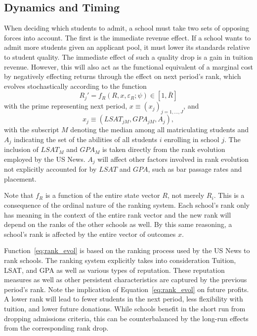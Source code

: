 \documentclass[12pt]{article}
\theoremstyle{definition}
\begin{document}
\subsection{Dynamics and Timing}
\label{sec:dynamics_timing}
When deciding which students to admit, a school must take two sets of opposing forces into account. The first is the immediate revenue effect. If a school wants to admit more students given an applicant pool, it must lower its standards relative to student quality. The immediate effect of such a quality drop is a gain in tuition revenue. However, this will also act as the functional equivalent of a marginal cost by negatively effecting returns through the effect on next period's rank, which evolves stochastically according to the function
\begin{equation}
  R_j' = f_R(R, x, \varepsilon_R; \psi) \in [1, \bar{R}]
  \label{eq:rank_evol}
\end{equation}
with the prime representing next period, $x \equiv (x_j)_{j=1, \dots, J}$, and
\[
  x_j \equiv (LSAT_{jM}, GPA_{jM}, A_j),
\]
with the subscript $M$ denoting the median among all matriculating students and $A_j$ indicating the set of the abilities of all students $i$ enrolling in school $j$. The inclusion of $LSAT_M$ and $GPA_M$ is taken directly from the rank evolution employed by the US News. $A_j$ will affect other factors involved in rank evolution not explicitly accounted for by $LSAT$ and $GPA$, such as bar passage rates and placement.

Note that $f_R$ is a function of the entire state vector $R$, not merely $R_i$. This is a consequence of the ordinal nature of the ranking system. Each school's rank only has meaning in the context of the entire rank vector and the new rank will depend on the ranks of the other schools as well. By this same reasoning, a school's rank is affected by the entire vector of outcomes $x$.

Function~\eqref{eq:rank_evol} is based on the ranking process used by the US News to rank schools. The ranking system explicitly takes into consideration Tuition, LSAT, and GPA as well as various types of reputation. These reputation measures as well as other persistent characteristics are captured by the previous period's rank. Note the implication of Equation~\eqref{eq:rank_evol} on future profits. A lower rank will lead to fewer students in the next period, less flexibility with tuition, and lower future donations. While schools benefit in the short run from dropping admissions criteria, this can be counterbalanced by the long-run effects from the corresponding rank drop.
\end{document}
